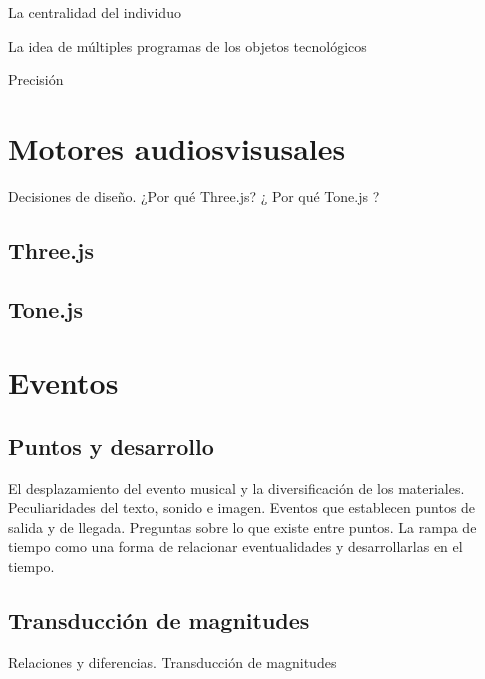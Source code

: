 La centralidad del individuo 

La idea de múltiples programas de los objetos tecnológicos \citep{latour}


Precisión 

\section{Motores audiosvisusales}

Decisiones de diseño. ¿Por qué Three.js? ¿ Por qué Tone.js ? 

\subsection{Three.js}

\subsection{Tone.js}


\section{Eventos}

\subsection{Puntos y desarrollo}

El desplazamiento del evento musical y la diversificación de los materiales. Peculiaridades del texto, sonido e imagen. Eventos que establecen puntos de salida y de llegada. Preguntas sobre lo que existe entre puntos. La rampa de tiempo como una forma de relacionar eventualidades y desarrollarlas en el tiempo.

\subsection{Transducción de magnitudes}

Relaciones y diferencias. Transducción de magnitudes 

